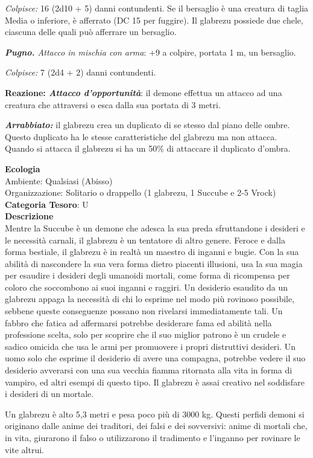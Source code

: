 \begin{multicols}{2}
{\emph{Colpisce:} 16 (2d10 + 5) danni contundenti. Se il bersaglio è una creatura di taglia Media o inferiore, è afferrato (DC 15 per fuggire). Il glabrezu possiede due chele, ciascuna delle quali può afferrare un bersaglio.

\emph{\textbf{Pugno.} Attacco in mischia con arma}: +9 a colpire, portata 1 m, un bersaglio.

\emph{Colpisce:} 7 (2d4 + 2) danni contundenti.

\textbf{Reazione: \emph{Attacco d'opportunità}}: il demone effettua un attacco ad una creatura che attraversi o esca dalla sua portata di 3 metri.

\emph{\textbf{Arrabbiato:}} il glabrezu crea un duplicato di se stesso dal piano delle ombre. Questo duplicato ha le stesse caratteristiche del glabrezu ma non attacca. Quando si attacca il glabrezu si ha un 50\% di attaccare il duplicato d'ombra.

\textbf{Ecologia}\\
Ambiente: Qualsiasi (Abisso)\\
Organizzazione: Solitario o drappello (1 glabrezu, 1 Succube e 2-5 Vrock)
\textbf{Categoria Tesoro}: U\\
\textbf{Descrizione}\\
Mentre la Succube è un demone che adesca la sua preda sfruttandone i desideri e le necessità carnali, il glabrezu è un tentatore di altro genere. Feroce e dalla forma bestiale, il glabrezu è in realtà un maestro di inganni e bugie. Con la sua abilità di nascondere la sua vera forma dietro piacenti illusioni, usa la sua magia per esaudire i desideri degli umanoidi mortali, come forma di ricompensa per coloro che soccombono ai suoi inganni e raggiri. Un desiderio esaudito da un glabrezu appaga la necessità di chi lo esprime nel modo più rovinoso possibile, sebbene queste conseguenze possano non rivelarsi immediatamente tali. Un fabbro che fatica ad affermarsi potrebbe desiderare fama ed abilità nella professione scelta, solo per scoprire che il suo miglior patrono è un crudele e sadico omicida che usa le armi per promuovere i propri distruttivi desideri. Un uomo solo che esprime il desiderio di avere una compagna, potrebbe vedere il suo desiderio avverarsi con una sua vecchia fiamma ritornata alla vita in forma di vampiro, ed altri esempi di questo tipo. Il glabrezu è assai creativo nel soddisfare i desideri di un mortale.

Un glabrezu è alto 5,3 metri e pesa poco più di 3000 kg. Questi perfidi demoni si originano dalle anime dei traditori, dei falsi e dei sovversivi: anime di mortali che, in vita, giurarono il falso o utilizzarono il tradimento e l'inganno per rovinare le vite altrui.

}
\end{multicols}
